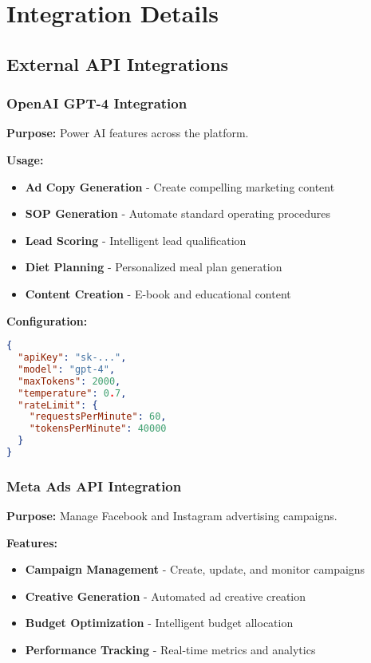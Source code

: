 \documentclass[12pt,a4paper]{article}
\newcommand{\samplecode}[1]{\begin{lstlisting}[language=JSON]#1\end{lstlisting}}
\begin{document}
\section{Integration Details}

\subsection{External API Integrations}

\subsubsection{OpenAI GPT-4 Integration}
\textbf{Purpose:} Power AI features across the platform.

\textbf{Usage:}
\begin{itemize}
    \item \textbf{Ad Copy Generation} - Create compelling marketing content
    \item \textbf{SOP Generation} - Automate standard operating procedures
    \item \textbf{Lead Scoring} - Intelligent lead qualification
    \item \textbf{Diet Planning} - Personalized meal plan generation
    \item \textbf{Content Creation} - E-book and educational content
\end{itemize}

\textbf{Configuration:}
\samplecode{
{
  "apiKey": "sk-...",
  "model": "gpt-4",
  "maxTokens": 2000,
  "temperature": 0.7,
  "rateLimit": {
    "requestsPerMinute": 60,
    "tokensPerMinute": 40000
  }
}
}

\subsubsection{Meta Ads API Integration}
\textbf{Purpose:} Manage Facebook and Instagram advertising campaigns.

\textbf{Features:}
\begin{itemize}
    \item \textbf{Campaign Management} - Create, update, and monitor campaigns
    \item \textbf{Creative Generation} - Automated ad creative creation
    \item \textbf{Budget Optimization} - Intelligent budget allocation
    \item \textbf{Performance Tracking} - Real-time metrics and analytics
\end{itemize}
\end{document}
